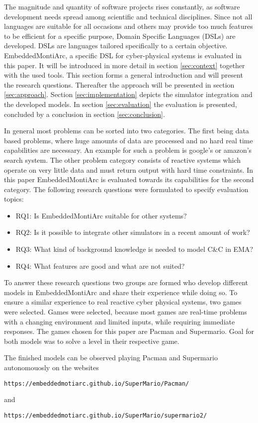 The magnitude and quantity of software projects rises constantly, as software development needs spread among scientific and technical disciplines. Since not all languages are suitable for all occasions and others may provide too much features to be efficient for a specific purpose, Domain Specific Languages (DSLs) are developed. DSLs are languages tailored specifically to a certain objective.
EmbeddedMontiArc, a specific DSL for cyber-physical systems is evaluated in this paper. It will be introduced in more detail in section \ref{sec:context} together with the used tools. This section forms a general introduction and will present the research questions.
Thereafter the approach will be presented in section \ref{sec:approach}. Section \ref{sec:implementation} depicts the simulator integration and the developed models. In section \ref{sec:evaluation} the evaluation is presented, concluded by a conclusion in section \ref{sec:conclusion}.

In general most problems can be sorted into two categories. The first being data based problems, where huge amounts of data are processed and no hard real time capabilities are necessary. An example for such a problem is google's or amazon's search system. The other problem category consists of reactive systems which operate on very little data and must return output with hard time constraints. In this paper EmbeddedMontiArc is evaluated towards its capabilities for the second category.
The following research questions were formulated to specify evaluation topics:

\begin{itemize}
	\item RQ1: Is EmbeddedMontiArc suitable for other systems?
	\item RQ2: Is it possible to integrate other simulators in a recent amount of work?
	\item RQ3: What kind of background knowledge is needed to model C\&C in EMA?
	\item RQ4: What features are good and what are not suited?
\end{itemize}

To answer these research questions two groups are formed who develop different models in EmbeddedMontiArc and share their experience while doing so. To ensure a similar experience to real reactive cyber physical systems, two games were selected.
Games were selected, because most games are real-time problems with a changing environment and limited inputs, while requiring immediate responses.
The games chosen for this paper are Pacman and Supermario. Goal for both models was to solve a level in their respective game.

The finished models can be observed playing Pacman and Supermario autonomouosly on the websites 
\begin{lstlisting}
https://embeddedmotiarc.github.io/SuperMario/Pacman/
\end{lstlisting}
and
\begin{lstlisting}
https://embeddedmotiarc.github.io/SuperMario/supermario2/
\end{lstlisting}
